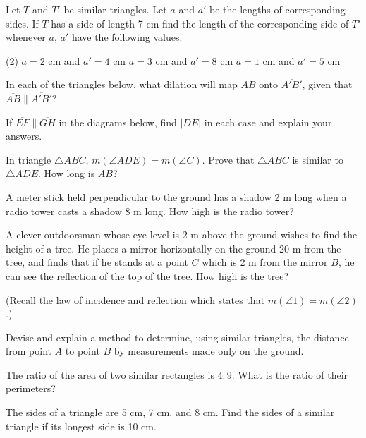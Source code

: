 \documentclass[12pt]{book} %
\begin{document}
\setcounter{Exercise}{0}
\begin{ExerciseList}
\Exercise Let $T$ and $T'$ be similar triangles. Let $a$ and $a'$ be the lengths of corresponding sides. If $T$ has a side of length 7 cm find the length of the corresponding side of $T'$ whenever $a$, $a'$ have the following values.
\begin{tasks}(2)
\task[(a)] $a=2$ cm and $a'=4$ cm
\task[(b)] $a=3$ cm and $a'=8$ cm
\task[(c)] $a=1$ cm and $a'=5$ cm
\end{tasks}

\Exercise In each of the triangles below, what dilation will map $\overline{AB}$ onto $\overline{A'B'}$, given that $\overline{AB}\parallel\overline{A'B'}$?


\Exercise If $\overline{EF}\parallel\overline{GH}$ in the diagrams below, find $|DE|$ in each case and explain your answers.


\Exercise In triangle $\triangle ABC$, $m(\angle ADE)=m(\angle C)$. Prove that $\triangle ABC$ is similar to $\triangle ADE$. How long is $AB$?


\Exercise A meter stick held perpendicular to the ground has a shadow 2 m long when a radio tower casts a shadow 8 m long. How high is the radio tower?

\Exercise A clever outdoorsman whose eye-level is 2 m above the ground wishes to find the height of a tree. He places a mirror horizontally on the ground 20 m from the tree, and finds that if he stands at a point $C$ which is 2 m from the mirror $B$, he can see the reflection of the top of the tree. How high is the tree?

(Recall the law of incidence and reflection which states that $m(\angle 1)=m(\angle 2)$.)


\Exercise Devise and explain a method to determine, using similar triangles, the distance from point $A$ to point $B$ by measurements made only on the ground.


\Exercise The ratio of the area of two similar rectangles is $4:9$. What is the ratio of their perimeters?

\Exercise The sides of a triangle are 5 cm, 7 cm, and 8 cm. Find the sides of a similar triangle if its longest side is 10 cm.


\end{ExerciseList}
\end{document}
